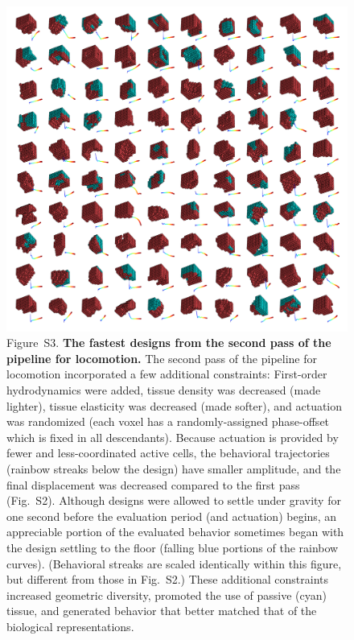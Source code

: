 \begin{figure}[t]
\centering
\includegraphics[width=\linewidth]{Chapter07/img/constrained_run_champs.png}
\caption*{Figure~S3.  \textbf{The fastest designs from the second pass of the pipeline for locomotion.} 
The second pass of the pipeline for locomotion incorporated a few additional constraints: First-order hydrodynamics were added, tissue density was decreased (made lighter), tissue elasticity was decreased (made softer), and actuation was randomized (each voxel has a randomly-assigned phase-offset which is fixed in all descendants). 
Because actuation is provided by fewer and less-coordinated active cells, the behavioral trajectories (rainbow streaks below the design) have smaller amplitude, and the final displacement was decreased compared to the first pass (Fig.~S2). 
Although designs were allowed to settle under gravity for one second before the evaluation period (and actuation) begins, an appreciable portion of the evaluated behavior sometimes began with the design settling to the floor (falling blue portions of the rainbow curves). 
(Behavioral streaks are scaled identically within this figure, but different from those in Fig.~S2.) 
These additional constraints increased geometric diversity, promoted the use of passive (cyan) tissue, and generated behavior that better matched that of the biological representations. 
}
\end{figure}




